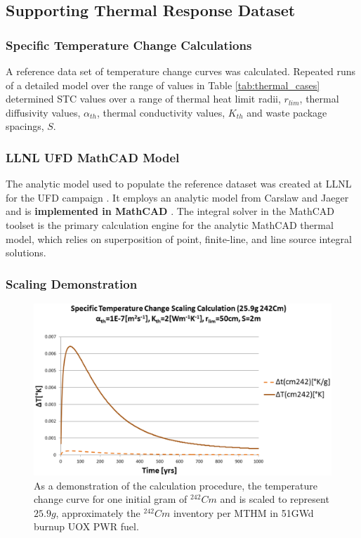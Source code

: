 \subsection{Supporting Thermal Response Dataset}
\begin{frame}[ctb!]
\frametitle{Specific Temperature Change Calculations}
\footnotesize{A reference data set of temperature change curves was calculated. 
Repeated runs of a detailed model over the range of values in Table 
\ref{tab:thermal_cases} determined \gls{STC} values over a range of thermal 
heat limit radii, $r_{lim}$, thermal diffusivity values, $\alpha_{th}$,
thermal conductivity values, $K_{th}$ and waste package spacings, $S$.


}
\end{frame}


\begin{frame}[ctb!]
\frametitle{LLNL UFD MathCAD Model}
\footnotesize{
The analytic model used to populate the reference dataset was created at 
\gls{LLNL} for the \gls{UFD} campaign \cite{hardin_generic_2011, 
greenberg_investigations_2012, greenberg_application_2012}. It employs an 
analytic model from Carslaw and Jaeger and is \textbf{implemented in MathCAD}
\cite{carslaw_conduction_1959, ptc_mathcad_2010}.  The integral solver in the 
MathCAD toolset is the primary calculation engine for the analytic MathCAD 
thermal model, which relies on superposition of point, finite-line, and line 
source integral solutions.  
}
\end{frame}



\begin{frame}[ctb!]
\frametitle{Scaling Demonstration}
\footnotesize{

\begin{figure}[h!]
\begin{center}
\includegraphics[width=\columnwidth]{./cyder/thermal_models/CmScaling.eps}
\end{center}
\caption{As a demonstration of the calculation procedure, the temperature change 
  curve for one initial gram of $^{242}Cm$ and is scaled to represent $25.9g$, 
  approximately the $^{242}Cm$ inventory per MTHM in 51GWd burnup UOX PWR fuel. }
\label{fig:CmScaling}
\end{figure}
}
\end{frame}

